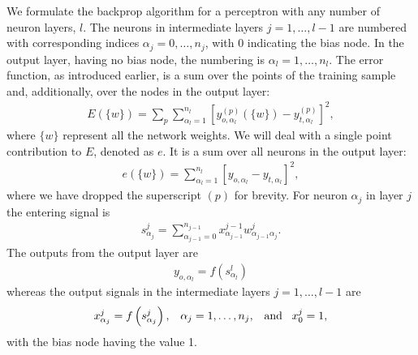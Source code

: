 \documentclass[letterpaper,10pt,english]{jupyterBook}
\begin{document}
\sphinxAtStartPar
We formulate the backprop algorithm for a perceptron with any number of neuron layers, \(l\). The neurons in intermediate layers \(j=1,\dots,l-1\) are numbered with corresponding indices \(\alpha_j=0,\dots,n_j\), with 0 indicating the bias node. In the output layer, having no bias node, the numbering is \(\alpha_l=1,\dots,n_l\).
The error function, as introduced earlier, is a sum over the points of the training sample and, additionally, over the nodes in the output layer:
\begin{equation*}
\begin{split}
E(\{w\})=\sum_p \sum_{\alpha_l=1}^{n_l} \left[ y_{o,{\alpha_l}}^{(p)}(\{w\})-y_{t,{\alpha_l}}^{(p)}\right]^2,
\end{split}
\end{equation*}
\sphinxAtStartPar
where \( \{w \} \) represent all the network weights.
We will deal with a single point contribution to \(E\), denoted as \( e \).
It is a sum over all neurons in the output layer:
\begin{equation*}
\begin{split}
e(\{w\})= \sum_{{\alpha_l}=1}^{n_l}\left[ y_{o,{\alpha_l}}-y_{t,{\alpha_l}}\right]^2, 
\end{split}
\end{equation*}
\sphinxAtStartPar
where we have dropped the superscript \((p)\) for brevity.
For neuron \(\alpha_j\) in layer \(j\) the entering signal is
\begin{equation*}
\begin{split}
s_{\alpha_j}^{j}=\sum_{\alpha_{j-1}=0}^{n_{j-1}} x_{\alpha_{j-1}}^{j-1} w_{\alpha_{j-1} \alpha_j}^{j}.
\end{split}
\end{equation*}
\sphinxAtStartPar
The outputs from the output layer are
\begin{equation*}
\begin{split}
y_{o,{\alpha_l}}=f\left( s_{\alpha_l}^{l} \right)
\end{split}
\end{equation*}
\sphinxAtStartPar
whereas the output signals in the intermediate layers \(j=1,\dots,l-1\) are
\begin{equation*}
\begin{split}
x_{\alpha_j}^{j}=f \left ( s_{\alpha_j}^{j}\right ),\;\;\;\alpha_{j}=1,\dots,n_j, \;\;\; {\rm and} \;\;\; x_0^{j}=1,
\end{split}
\end{equation*}
\sphinxAtStartPar
with the bias node having the value 1.
\end{document}

